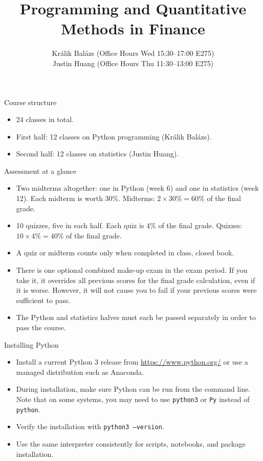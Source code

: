 \documentclass[aspectratio=169,11pt]{beamer}
\title{Programming and Quantitative Methods in Finance}
\subtitle{Králik Balázs (Office Hours Wed 15:30--17:00 E275) \\
Justin Huang (Office Hours Thu 11:30--13:00 E275)}
\author{}
\date{}
\begin{document}
\titleandoutline


\begin{frame}{Course structure}
  \begin{itemize}
    \item 24 classes in total.
    \item First half: 12 classes on Python programming (Králik Balázs).
    \item Second half: 12 classes on statistics (Justin Huang).
  \end{itemize}
\end{frame}

\begin{frame}{Assessment at a glance}
  \begin{itemize}
    \item Two midterms altogether: one in Python (week 6) and one in statistics
          (week 12). Each midterm is worth 30\%. Midterms: $2 \times 30\% = 60\%$
          of the final grade.
    \item 10 quizzes, five in each half. Each quiz is 4\% of the final grade.
          Quizzes: $10 \times 4\% = 40\%$ of the final grade.
    \item A quiz or midterm counts only when completed in class, closed book.
    \item There is one optional combined make-up exam in the exam period. If you
          take it, it overrides all previous scores for the final grade calculation,
          even if it is worse. However, it will not cause you to fail if your
          previous scores were sufficient to pass.
    \item The Python and statistics halves must each be passed separately in order
          to pass the course.
  \end{itemize}
\end{frame}


\begin{frame}{Installing Python}
  \begin{itemize}
    \item Install a current Python 3 release from \url{https://www.python.org/}
          or use a managed distribution such as Anaconda.
    \item During installation, make sure Python can be run from the
          command line. Note that on some systems, you may need to use
          \texttt{python3} or \texttt{Py} instead of \texttt{python}.
    \item Verify the installation with \texttt{python3 --version}.
    \item Use the same interpreter consistently for scripts, notebooks, and
          package installation.
  \end{itemize}
\end{frame}
\end{document}
